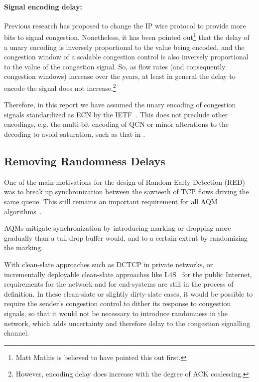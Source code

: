 \paragraph{Signal encoding delay:} Previous research has proposed to change the IP wire protocol to provide more bits to signal congestion. Nonetheless, it has been pointed out\footnote{Matt Mathis is believed to have pointed this out first.} that the delay of a unary encoding is inversely proportional to the value being encoded, and the congestion window of a scalable congestion control is also inversely proportional to the value of the congestion signal. So, as flow rates (and consequently congestion windows) increase over the years, at least in general the delay to encode the signal does not increase.\footnote{However, encoding delay does increase with the degree of ACK coalescing.}

Therefore, in this report we have assumed the unary encoding of congestion signals standardized as ECN by the IETF~\cite{IETF_RFC3168:ECN_IP_TCP}. This does not preclude other encodings, e.g. the multi-bit encoding of QCN or minor alterations to the decoding to avoid saturation, such as that in \cite{Briscoe17a:CC_Tensions_TR}.

\subsection{Removing Randomness Delays}\label{sec:rand_delay}

One of the main motivations for the design of Random Early Detection (RED)~\cite{Floyd93:RED} was to break up synchronization between the sawteeth of TCP flows driving the same queue. This still remains an important requirement for all AQM algorithms~\cite{Baker15:AQM_Recommendations}.

AQMs mitigate synchronization by introducing marking or dropping more gradually than a tail-drop buffer would, and to a certain extent by randomizing the marking. 

With clean-slate approaches such as DCTCP in private networks, or incrementally deployable clean-slate approaches like L4S~\cite{Briscoe16a:l4s-arch_ID} for the public Internet, requirements for the network and for end-systems are still in the process of definition. In these clean-slate or slightly dirty-slate cases, it would be possible to require the sender's congestion control to dither its response to congestion signals, so that it would not be necessary to introduce randomness in the network, which adds uncertainty and therefore delay to the congestion signalling channel. 

